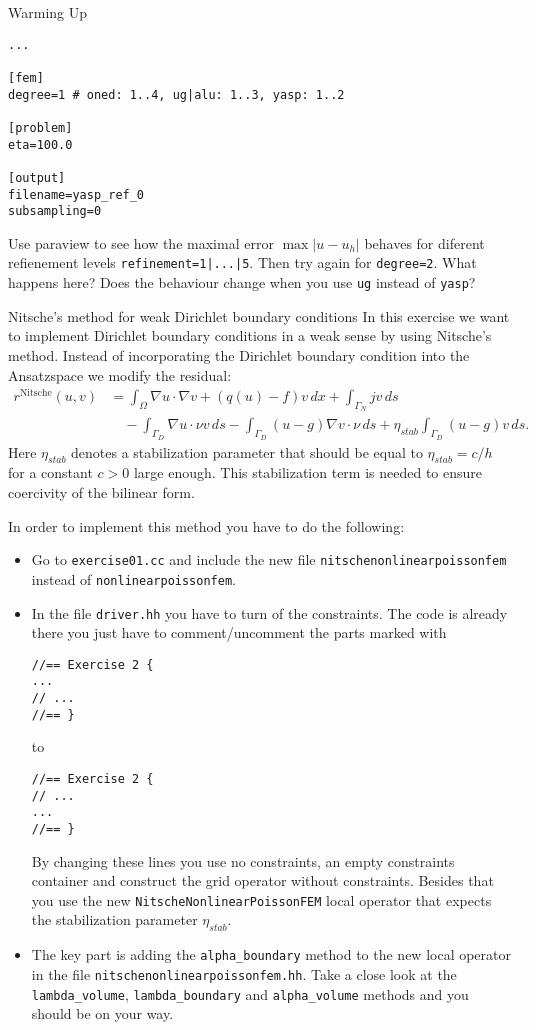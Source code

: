 \documentclass[12pt,a4paper]{article}
\begin{document}
\begin{Exercise}{Warming Up}
\begin{enumerate}
\begin{lstlisting}
...

[fem]
degree=1 # oned: 1..4, ug|alu: 1..3, yasp: 1..2

[problem]
eta=100.0

[output]
filename=yasp_ref_0
subsampling=0
    \end{lstlisting}
    Use paraview to see how the maximal error $\max|u-u_h|$ behaves
    for diferent refienement levels \lstinline{refinement=1|...|5}.
    Then try again for \lstinline{degree=2}.  What happens here?  Does
    the behaviour change when you use \lstinline{ug} instead of
    \lstinline{yasp}?
  \end{enumerate}
\end{Exercise}

\begin{Exercise}{Nitsche's method for weak Dirichlet boundary
    conditions}
  In this exercise we want to implement Dirichlet boundary conditions
  in a weak sense by using Nitsche's method.  Instead of
  incorporating the Dirichlet boundary condition into the Ansatzspace
  we modify the residual:
  \begin{align*}
    r^{\text{Nitsche}}(u,v) &= \int_\Omega \nabla u \cdot \nabla v + (q(u)-f)v\,dx + \int_{\Gamma_N} jv\,ds \\
    &\quad - \int_{\Gamma_D} \nabla u \cdot\nu v\,ds - \int_{\Gamma_D} (u-g)\nabla v \cdot\nu\,ds
    + \eta_{stab} \int_{\Gamma_D} (u-g)v\,ds.
  \end{align*}
  Here $\eta_{stab}$ denotes a stabilization parameter that should be
  equal to $\eta_{stab}=c/h$ for a constant $c>0$ large enough.  This
  stabilization term is needed to ensure coercivity of the bilinear
  form.

  In order to implement this method you have to do the following:
  \begin{itemize}
  \item Go to \lstinline{exercise01.cc} and include the new file
    \lstinline{nitschenonlinearpoissonfem} instead of
    \lstinline{nonlinearpoissonfem}.
  \item In the file \lstinline{driver.hh} you have to turn of the
    constraints.  The code is already there you just have to
    comment/uncomment the parts marked with
    \begin{lstlisting}
//== Exercise 2 {
...
// ...
//== }
    \end{lstlisting}
    to
    \begin{lstlisting}
//== Exercise 2 {
// ...
...
//== }
    \end{lstlisting}
    By changing these lines you use no constraints, an empty
    constraints container and construct the grid operator without
    constraints.  Besides that you use the new
    \lstinline{NitscheNonlinearPoissonFEM} local operator that expects
    the stabilization parameter $\eta_{stab}$.
  \item The key part is adding the \lstinline{alpha_boundary} method
    to the new local operator in the file
    \lstinline{nitschenonlinearpoissonfem.hh}.  Take a close look at
    the \lstinline{lambda_volume}, \lstinline{lambda_boundary} and
    \lstinline{alpha_volume} methods and you should be on your way.


\end{itemize}
\end{Exercise}
\end{document}
